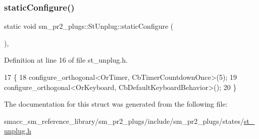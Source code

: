\subsubsection{\texorpdfstring{static\+Configure()}{staticConfigure()}}
{\footnotesize\ttfamily static void sm\+\_\+pr2\+\_\+plugs\+::\+St\+Unplug\+::static\+Configure (\begin{DoxyParamCaption}{ }\end{DoxyParamCaption})\hspace{0.3cm}{\ttfamily [inline]}, {\ttfamily [static]}}



Definition at line 16 of file st\+\_\+unplug.\+h.


\begin{DoxyCode}
17     \{
18         configure\_orthogonal<OrTimer,  CbTimerCountdownOnce>(5);    
19         configure\_orthogonal<OrKeyboard, CbDefaultKeyboardBehavior>();
20     \}
\end{DoxyCode}


The documentation for this struct was generated from the following file\+:\begin{DoxyCompactItemize}
\item 
smacc\+\_\+sm\+\_\+reference\+\_\+library/sm\+\_\+pr2\+\_\+plugs/include/sm\+\_\+pr2\+\_\+plugs/states/\hyperlink{st__unplug_8h}{st\+\_\+unplug.\+h}\end{DoxyCompactItemize}
